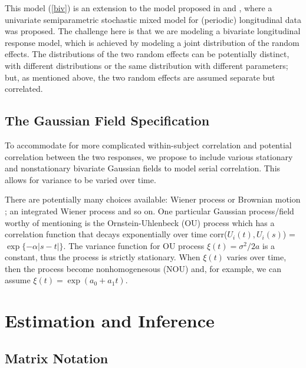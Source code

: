 \documentclass[article,lineno]{biometrika}
\begin{document}
This model (\ref{biv}) is an extension to the model proposed in \citet {Zhang:1998} and \citet {Zhan:Lin:Sowe:quan:2000}, where a univariate semiparametric stochastic mixed model for (periodic) longitudinal data was proposed. The challenge here is that we are modeling a bivariate longitudinal response model, which  is achieved  by modeling a joint distribution of the random effects. The distributions of the two random effects can be potentially distinct, with different distributions or the same distribution with different parameters; but, as mentioned above,  the two random effects are  assumed separate but correlated. 


\subsection{The Gaussian Field Specification}

To accommodate for more complicated within-subject correlation and potential correlation between the two responses, we propose to include various stationary and nonstationary bivariate Gaussian fields to model serial correlation. This allows for variance to be varied over time. 

There are potentially many choices available: Wiener process or Brownian motion \citep{Tayl:Cumb:Sy:quan:1994}; an integrated Wiener process and so on. One particular Gaussian process/field worthy of mentioning is the Ornstein-Uhlenbeck (OU) process \citep{Koralov:2007} which has a correlation function that decays exponentially over time corr($U_i(t), U_i(s)$) = $\exp\{-\alpha|s-t|\}$. The variance function for OU process $\xi(t) = \sigma^2/2a$ is a constant, thus the process is strictly stationary. When $\xi(t)$ varies over time, then the process become nonhomogenesous (NOU) and, for example, we can assume $\xi(t) = \exp(a_0 + a_1 t)$. 

%
%
%

\section{Estimation and Inference} \label{est}

\subsection{Matrix Notation} \label{MatrixNotation}
\end{document}
